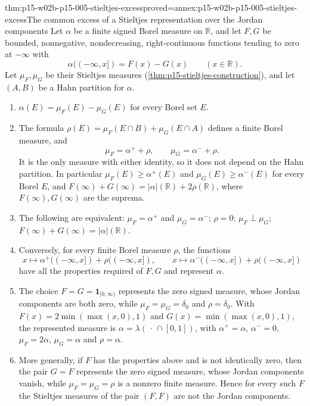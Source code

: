 \begin{hbtheorem}{thm:p15-w02b-p15-005-stieltjes-excess}{proved=annex:p15-w02b-p15-005-stieltjes-excess}{The common excess of a Stieltjes representation over the Jordan components}
Let \(\alpha\) be a finite signed Borel measure on \(\mathbb R\), and let
\(F,G\) be bounded, nonnegative, nondecreasing, right-continuous
functions tending to zero at \(-\infty\) with
\[
                     \alpha((-\infty,x])=F(x)-G(x)\qquad(x\in\mathbb R).
\]
Let \(\mu_F,\mu_G\) be their Stieltjes measures
(\cref{thm:p15-stieltjes-construction}), and let \((A,B)\) be a Hahn
partition for \(\alpha\).
\begin{enumerate}
\item \(\alpha(E)=\mu_F(E)-\mu_G(E)\) for every Borel set \(E\).
\item The formula
      \(\rho(E)=\mu_F(E\cap B)+\mu_G(E\cap A)\) defines a finite Borel
      measure, and
      \[
              \mu_F=\alpha^++\rho,\qquad \mu_G=\alpha^-+\rho .
      \]
      It is the only measure with either identity, so it does not
      depend on the Hahn partition. In particular
      \(\mu_F(E)\geq\alpha^+(E)\) and \(\mu_G(E)\geq\alpha^-(E)\)
      for every Borel \(E\), and
      \(F(\infty)+G(\infty)=\lvert\alpha\rvert(\mathbb R)+2\rho(\mathbb R)\),
      where \(F(\infty),G(\infty)\) are the suprema.
\item The following are equivalent: \(\mu_F=\alpha^+\) and
      \(\mu_G=\alpha^-\); \(\rho=0\); \(\mu_F\perp\mu_G\);
      \(F(\infty)+G(\infty)=\lvert\alpha\rvert(\mathbb R)\).
\item Conversely, for every finite Borel measure \(\rho\), the functions
      \[
        x\mapsto\alpha^+((-\infty,x])+\rho((-\infty,x]),\qquad
        x\mapsto\alpha^-((-\infty,x])+\rho((-\infty,x])
      \]
      have all the properties required of \(F,G\) and represent
      \(\alpha\).
\item The choice \(F=G=\mathbf1_{[0,\infty)}\) represents the zero
      signed measure, whose Jordan components are both zero, while
      \(\mu_F=\mu_G=\delta_0\) and \(\rho=\delta_0\). With
      \(F(x)=2\min(\max(x,0),1)\) and \(G(x)=\min(\max(x,0),1)\), the
      represented measure is \(\alpha=\lambda(\,\cdot\,\cap[0,1])\),
      with \(\alpha^+=\alpha\), \(\alpha^-=0\),
      \(\mu_F=2\alpha\), \(\mu_G=\alpha\) and \(\rho=\alpha\).
\item More generally, if \(F\) has the properties above and is not
      identically zero, then the pair \(G=F\) represents the zero
      signed measure, whose Jordan components vanish, while
      \(\mu_F=\mu_G=\rho\) is a nonzero finite measure. Hence for every
      such \(F\) the Stieltjes measures of the pair \((F,F)\) are not
      the Jordan components.
\end{enumerate}
\end{hbtheorem}

